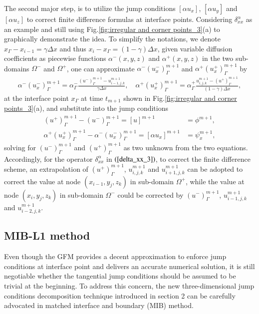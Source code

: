 \documentclass[dissertation]{uathesis}
\begin{document}
\begin{body}
\begin{flushleft}
\hspace{1cm} The second major step, is to utilize the jump conditions $[\alpha u_x]$, $[\alpha u_y]$ and $[\alpha u_z]$ to correct finite difference formulas at interface points. Considering $\delta^{\alpha}_{xx}$ as an example and still using Fig.\ref{fig:irregular and corner points_3}(a) to graphically  demonstrate the idea. To simplify the notations, we denote $x_\Gamma - x_{i-1} = \gamma \Delta x$ and thus $x_{i} - x_\Gamma = (1 - \gamma) \Delta x$, given variable diffusion coefficients as piecewise functions $\alpha^{-}(x,y,z)$ and $\alpha^{+}(x,y,z)$ in the two sub-domains $\Omega^{-}$ and $\Omega^{+}$, one can approximate $\alpha^{-}(u^{-}_{x})^{m+1}_{\Gamma}$ and $\alpha^{+}(u^{+}_{x})^{m+1}_{\Gamma}$ by
%
\begin{align}\label{GFM_interface_approximation_3}
\alpha^{-}(u^{-}_{x})^{m+1}_{\Gamma} = \alpha^{-}_{\Gamma}\frac{(u^{-})^{m+1}_{\Gamma} - 
	u^{m+1}_{i-1,j,k}}{\gamma \Delta x}, \quad
\alpha^{+}(u^{+}_{x})^{m+1}_{\Gamma} = \alpha^{+}_{\Gamma}\frac{u^{m+1}_{i,j,k} - 
	(u^{+})^{m+1}_{\Gamma}}{(1-\gamma)\Delta x}, 
\end{align}
%
at the interface point $x_\Gamma$ at time $t_{m+1}$ shown in Fig.\ref{fig:irregular and corner points_3}(a), and substitute into the jump conditions
%
\begin{align}
\label{GFM_jump_equation_1_3}
(u^{+})^{m+1}_{\Gamma} - (u^{-})^{m+1}_{\Gamma} = [u]^{m+1} &= \phi^{m+1}, \\
\label{GFM_jump_equation_2_3}
\alpha^{+} (u^{+}_x)^{m+1}_{\Gamma} - \alpha^{-}(u^{-}_x)^{m+1}_{\Gamma} = 
[\alpha u_x]^{m+1} &= \psi_x^{m+1}, 
\end{align}
%
solving for $(u^{-})^{m+1}_{\Gamma}$ and $(u^{+})^{m+1}_{\Gamma}$ as two unknown from the two equations. Accordingly, for the operator $\delta_{xx}^{\alpha}$ in $(\ref{delta_xx_3})$, to correct the finite difference scheme, an extrapolation of $(u^{+})^{m+1}_{\Gamma}$, $u^{m+1}_{i,j,k}$ and $u^{m+1}_{i+1,j,k}$ can be adopted to correct the value at node $(x_{i-1},y_j,z_k)$ in sub-domain $\Omega^{+}$, while the value at node $(x_i,y_j,z_k)$ in sub-domain $\Omega^{-}$ could be corrected by $(u^{-})^{m+1}_{\Gamma}$, $u^{m+1}_{i-1,j,k}$ and $u^{m+1}_{i-2,j,k}$.

\subsection{MIB-L1 method}
\hspace{1cm} Even though the GFM provides a decent approximation to enforce jump conditions at interface point and delivers an accurate numerical solution, it is still negotiable whether the tangential jump conditions should be assumed to be trivial at the beginning. To address this concern, the new three-dimensional jump conditions decomposition technique introduced in section 2 can be carefully advocated in matched interface and boundary (MIB) method.


\end{flushleft}
\end{body}
\end{document}
